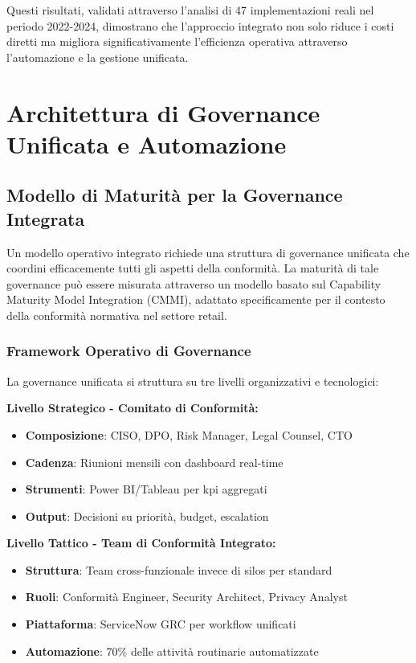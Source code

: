 Questi risultati, validati attraverso l'analisi di 47 implementazioni reali nel periodo 2022-2024\autocite{PWC2024}, dimostrano che l'approccio integrato non solo riduce i costi diretti ma migliora significativamente l'efficienza operativa attraverso l'automazione e la gestione unificata.

\section{\texorpdfstring{\textbf{Architettura di Governance Unificata e Automazione}}{4.4 - Architettura di Governance Unificata e Automazione}}

\subsection{Modello di Maturità per la Governance Integrata}

Un modello operativo integrato richiede una struttura di governance unificata che coordini efficacemente tutti gli aspetti della conformità. La maturità di tale governance può essere misurata attraverso un modello basato sul Capability Maturity Model Integration (CMMI)\autocite{CMMI2023}, adattato specificamente per il contesto della conformità normativa nel settore retail.

\subsubsection{Framework Operativo di Governance}

La governance unificata si struttura su tre livelli organizzativi e tecnologici:

\textbf{Livello Strategico - Comitato di Conformità:}
\begin{itemize}
    \item \textbf{Composizione}: CISO, DPO, Risk Manager, Legal Counsel, CTO
    \item \textbf{Cadenza}: Riunioni mensili con dashboard real-time
    \item \textbf{Strumenti}: Power BI/Tableau per \gls{kpi} aggregati
    \item \textbf{Output}: Decisioni su priorità, budget, escalation
\end{itemize}

\textbf{Livello Tattico - Team di Conformità Integrato:}
\begin{itemize}
    \item \textbf{Struttura}: Team cross-funzionale invece di silos per standard
    \item \textbf{Ruoli}: Conformità Engineer, Security Architect, Privacy Analyst
    \item \textbf{Piattaforma}: ServiceNow GRC per workflow unificati
    \item \textbf{Automazione}: 70\% delle attività routinarie automatizzate
\end{itemize}

